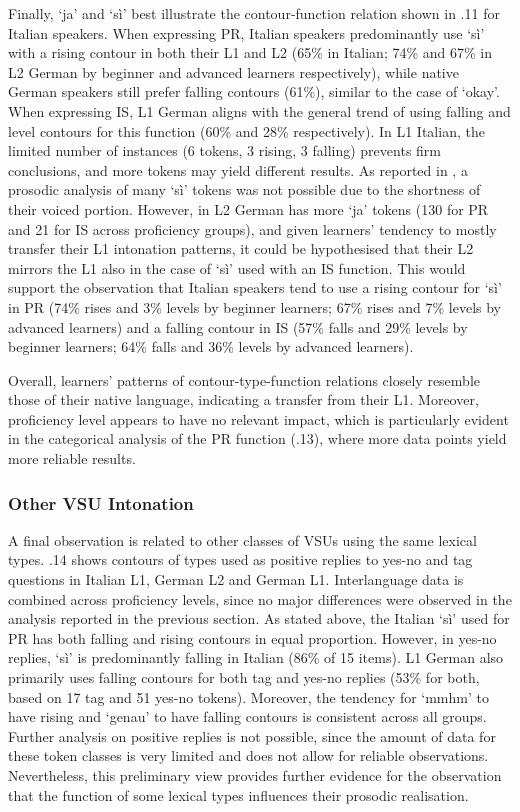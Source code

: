Finally, ‘ja’ and ‘sì’ best illustrate the contour-function relation shown in .11 for Italian speakers. When expressing PR, Italian speakers predominantly use ‘sì’ with a rising contour in both their L1 and L2 (65\% in Italian; 74\% and 67\% in L2 German by beginner and advanced learners respectively), while native German speakers still prefer falling contours (61\%), similar to the case of ‘okay’. When expressing IS, L1 German aligns with the general trend of using falling and level contours for this function (60\% and 28\% respectively). In L1 Italian, the limited number of instances (6 tokens, 3 rising, 3 falling) prevents firm conclusions, and more tokens may yield different results. As reported in , a prosodic analysis of many ‘sì’ tokens was not possible due to the shortness of their voiced portion. However, in L2 German has more ‘ja’ tokens (130 for PR and 21 for IS across proficiency groups), and given learners’ tendency to mostly transfer their L1 intonation patterns, it could be hypothesised that their L2 mirrors the L1 also in the case of ‘sì’ used with an IS function. This would support the observation that Italian speakers tend to use a rising contour for ‘sì’ in PR (74\% rises and 3\% levels by beginner learners; 67\% rises and 7\% levels by advanced learners) and a falling contour in IS (57\% falls and 29\% levels by beginner learners; 64\% falls and 36\% levels by advanced learners).

Overall, learners’ patterns of contour-type-function relations closely resemble those of their native language, indicating a transfer from their L1. Moreover, proficiency level appears to have no relevant impact, which is particularly evident in the categorical analysis of the PR function (.13), where more data points yield more reliable results.

\subsubsection{Other VSU Intonation}
\hypertarget{Toc191305958}{}
A final observation is related to other classes of VSUs using the same lexical types. .14 shows contours of types used as positive replies to yes-no and tag questions in Italian L1, German L2 and German L1. Interlanguage data is combined across proficiency levels, since no major differences were observed in the analysis reported in the previous section. As stated above, the Italian ‘sì’ used for PR has both falling and rising contours in equal proportion. However, in yes-no replies, ‘sì’ is predominantly falling in Italian (86\% of 15 items). L1 German also primarily uses falling contours for both tag and yes-no replies (53\% for both, based on 17 tag and 51 yes-no tokens). Moreover, the tendency for ‘mmhm’ to have rising and ‘genau’ to have falling contours is consistent across all groups. Further analysis on positive replies is not possible, since the amount of data for these token classes is very limited and does not allow for reliable observations. Nevertheless, this preliminary view provides further evidence for the observation that the function of some lexical types influences their prosodic realisation.

